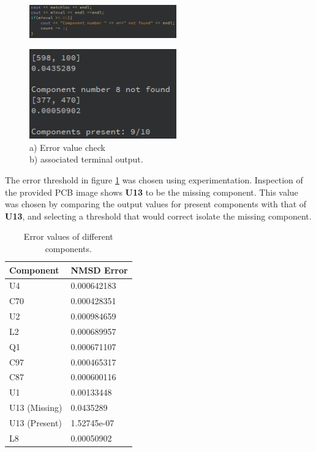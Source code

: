 \documentclass[conference]{IEEEtran}
\begin{document}
\begin{figure}[H]
\centering
\includegraphics[width=2.5in]{t3_code2}
\end{figure}   
\begin{figure}[H]
\centering
\includegraphics[width=2.5in]{t3_outputTerminal}
\caption{a) Error value check \\b) associated terminal output.}
\label{fig_t3code2}
\end{figure}
The error threshold in figure \ref{fig_t3code2} was chosen using experimentation. Inspection of the provided PCB image shows \textbf{U13} to be the missing component. This value was chosen by comparing the output values for present components with that of \textbf{U13}, and selecting a threshold that would correct isolate the missing component. 

\begin{table}[]
\caption{Error values of different components.}
\label{tab:t3error}
\begin{tabular}{|l|l|}
\hline
\textbf{Component} & \textbf{NMSD Error} \\ \hline
U4                 & 0.000642183         \\ \hline
C70                & 0.000428351         \\ \hline
U2                 & 0.000984659         \\ \hline
L2                 & 0.000689957         \\ \hline
Q1                 & 0.000671107         \\ \hline
C97                & 0.000465317         \\ \hline
C87                & 0.000600116         \\ \hline
U1                 & 0.00133448          \\ \hline
U13 (Missing)      & 0.0435289           \\ \hline
U13 (Present)      & 1.52745e-07         \\ \hline
L8                 & 0.00050902          \\ \hline
\end{tabular}
\end{table}
\end{document}
